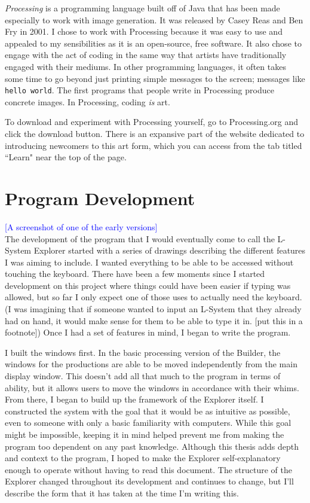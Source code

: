 \documentclass[12pt,twoside]{reedthesis}
\newcommand{\code}[1]{\texttt{#1}}
\begin{document}
	\textit{Processing} is a programming language built off of Java that has been made especially to work with image generation. It was released by Casey Reas and Ben Fry in 2001. I chose to work with Processing because it was easy to use and appealed to my sensibilities as it is an open-source, free software. It also chose to engage with the act of coding in the same way that artists have traditionally engaged with their mediums. In other programming languages, it often takes some time to go beyond just printing simple messages to the screen; messages like \code{hello world}. The first programs that people write in Processing produce concrete images. In Processing, coding \textit{is} art.
	
	To download and experiment with Processing yourself, go to Processing.org and click the download button. There is an expansive part of the website dedicated to introducing newcomers to this art form, which you can access from the tab titled ``Learn" near the top of the page.

\section{Program Development}

	\textcolor{blue}{[A screenshot of one of the early versions]}\\

	The development of the program that I would eventually come to call the L-System Explorer started with a series of drawings describing the different features I was aiming to include. I wanted everything to be able to be accessed without touching the keyboard. There have been a few moments since I started development on this project where things could have been easier if typing was allowed, but so far I only expect one of those uses to actually need the keyboard. (I was imagining that if someone wanted to input an L-System that they already had on hand, it would make sense for them to be able to type it in. [put this in a footnote]) Once I had a set of features in mind, I began to write the program.
	
	I built the windows first. In the basic processing version of the Builder, the windows for the productions are able to be moved independently from the main display window. This doesn't add all that much to the program in terms of ability, but it allows users to move the windows in accordance with their whims. From there, I began to build up the framework of the Explorer itself. I constructed the system with the goal that it would be as intuitive as possible, even to someone with only a basic familiarity with computers. While this goal might be impossible, keeping it in mind helped prevent me from making the program too dependent on any past knowledge. Although this thesis adds depth and context to the program, I hoped to make the Explorer self-explanatory enough to operate without having to read this document. The structure of the Explorer changed throughout its development and continues to change, but I'll describe the form that it has taken at the time I'm writing this.\\
	
\end{document}

